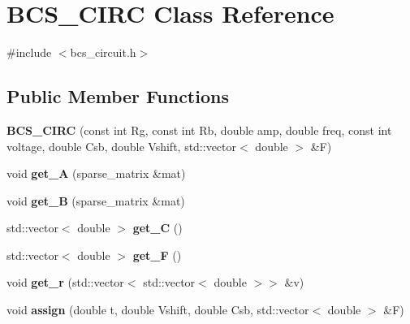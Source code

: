 \hypertarget{classBCS__CIRC}{\section{B\-C\-S\-\_\-\-C\-I\-R\-C Class Reference}
\label{classBCS__CIRC}
}


{\ttfamily \#include $<$bcs\-\_\-circuit.\-h$>$}

\subsection*{Public Member Functions}
\begin{DoxyCompactItemize}
\item 
\hypertarget{classBCS__CIRC_a4b61d0e762a23f55d362c6bd10024c7e}{{\bfseries B\-C\-S\-\_\-\-C\-I\-R\-C} (const int Rg, const int Rb, double amp, double freq, const int voltage, double Csb, double Vshift, std\-::vector$<$ double $>$ \&F)}\label{classBCS__CIRC_a4b61d0e762a23f55d362c6bd10024c7e}

\item 
\hypertarget{classBCS__CIRC_a8c649e497142492a833d70188bfde96f}{void {\bfseries get\-\_\-\-A} (sparse\-\_\-matrix \&mat)}\label{classBCS__CIRC_a8c649e497142492a833d70188bfde96f}

\item 
\hypertarget{classBCS__CIRC_a60519d82f279c7a6afe9db71a835c15e}{void {\bfseries get\-\_\-\-B} (sparse\-\_\-matrix \&mat)}\label{classBCS__CIRC_a60519d82f279c7a6afe9db71a835c15e}

\item 
\hypertarget{classBCS__CIRC_a0f8f5630acbe4ec04d0aa34943d40ccc}{std\-::vector$<$ double $>$ {\bfseries get\-\_\-\-C} ()}\label{classBCS__CIRC_a0f8f5630acbe4ec04d0aa34943d40ccc}

\item 
\hypertarget{classBCS__CIRC_a4e0cd722e16a3f45b51d6698022c090e}{std\-::vector$<$ double $>$ {\bfseries get\-\_\-\-F} ()}\label{classBCS__CIRC_a4e0cd722e16a3f45b51d6698022c090e}

\item 
\hypertarget{classBCS__CIRC_aa001c5cc3cd7238cba1e906d705e35a2}{void {\bfseries get\-\_\-r} (std\-::vector$<$ std\-::vector$<$ double $>$$>$ \&v)}\label{classBCS__CIRC_aa001c5cc3cd7238cba1e906d705e35a2}

\item 
\hypertarget{classBCS__CIRC_ae4ef3d4b2a09a1798ae41b664046c4a8}{void {\bfseries assign} (double t, double Vshift, double Csb, std\-::vector$<$ double $>$ \&F)}\label{classBCS__CIRC_ae4ef3d4b2a09a1798ae41b664046c4a8}

\end{DoxyCompactItemize}
